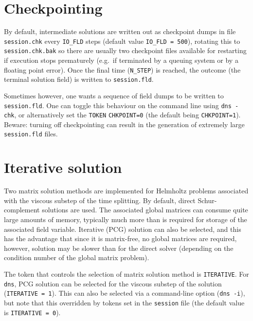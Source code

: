 \documentclass[11pt]{report}
\newcommand{\eg}{e.g.\ } \newcommand{\CC}{\mathrm{c.c.}}
\begin{document}
\section{Checkpointing}
\label{sec.check}

By default, intermediate solutions are written out as checkpoint dumps
in file \verb+session.chk+ every \verb+IO_FLD+ steps (default value
\verb+IO_FLD = 500+), rotating this to \verb+session.chk.bak+ so there
are usually two checkpoint files available for restarting if execution
stops prematurely (\eg if terminated by a queuing system or by a
floating point error).  Once the final time (\verb+N_STEP+) is
reached, the outcome (the terminal solution field) is written to
\verb+session.fld+.

Sometimes however, one wants a sequence of field dumps to be written
to \verb+session.fld+.  One can toggle this behaviour on the command
line using \verb+dns -chk+, or alternatively set the \verb+TOKEN+
\verb+CHKPOINT=0+ (the default being \verb+CHKPOINT=1+).  Beware:
turning off checkpointing can result in the generation of extremely
large \verb+session.fld+ files.

\section{Iterative solution}
\label{sec.iterative}

Two matrix solution methods are implemented for Helmholtz problems
associated with the viscous substep of the time splitting.  By
default, direct Schur-complement solutions are used.  The associated
global matrices can consume quite large amounts of memory, typically
much more than is required for storage of the associated field
variable.  Iterative (PCG) solution can also be selected, and this has
the advantage that since it is matrix-free, no global matrices are
required, however, solution may be slower than for the direct solver
(depending on the condition number of the global matrix problem).

The token that controls the selection of matrix solution method is
\verb+ITERATIVE+.  For \verb+dns+, PCG solution can be selected for
the viscous substep of the solution (\verb+ITERATIVE = 1+).  This can
also be selected via a command-line option (\verb+dns -i+), but note
that this overridden by tokens set in the \verb+session+ file (the
default value is \verb+ITERATIVE = 0+).
\end{document}
